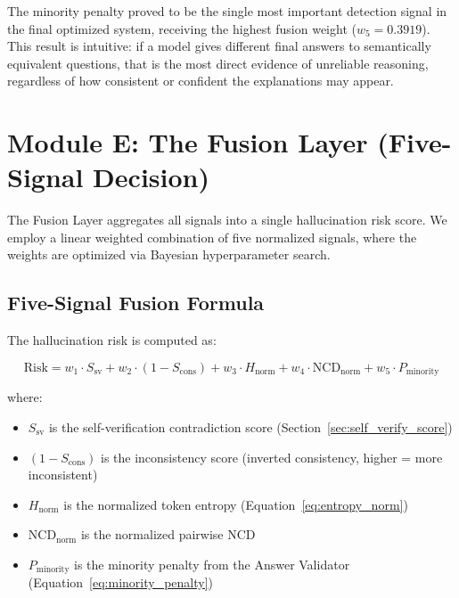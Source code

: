 \noindent
The minority penalty proved to be the single most important detection signal in the final optimized system, receiving the highest fusion weight ($w_5 = 0.3919$). This result is intuitive: if a model gives different final answers to semantically equivalent questions, that is the most direct evidence of unreliable reasoning, regardless of how consistent or confident the explanations may appear.


\section{Module E: The Fusion Layer (Five-Signal Decision)}

The Fusion Layer aggregates all signals into a single hallucination risk score. We employ a linear weighted combination of five normalized signals, where the weights are optimized via Bayesian hyperparameter search.

\subsection{Five-Signal Fusion Formula}

The hallucination risk is computed as:

\begin{equation}
    \text{Risk} = w_1 \cdot S_{\text{sv}} + w_2 \cdot (1 - S_{\text{cons}}) + w_3 \cdot H_{\text{norm}} + w_4 \cdot \text{NCD}_{\text{norm}} + w_5 \cdot P_{\text{minority}}
    \label{eq:fusion}
\end{equation}

\noindent
where:
\begin{itemize}
    \item $S_{\text{sv}}$ is the self-verification contradiction score (Section~\ref{sec:self_verify_score})
    \item $(1 - S_{\text{cons}})$ is the inconsistency score (inverted consistency, higher = more inconsistent)
    \item $H_{\text{norm}}$ is the normalized token entropy (Equation~\ref{eq:entropy_norm})
    \item $\text{NCD}_{\text{norm}}$ is the normalized pairwise NCD
    \item $P_{\text{minority}}$ is the minority penalty from the Answer Validator (Equation~\ref{eq:minority_penalty})
\end{itemize}

